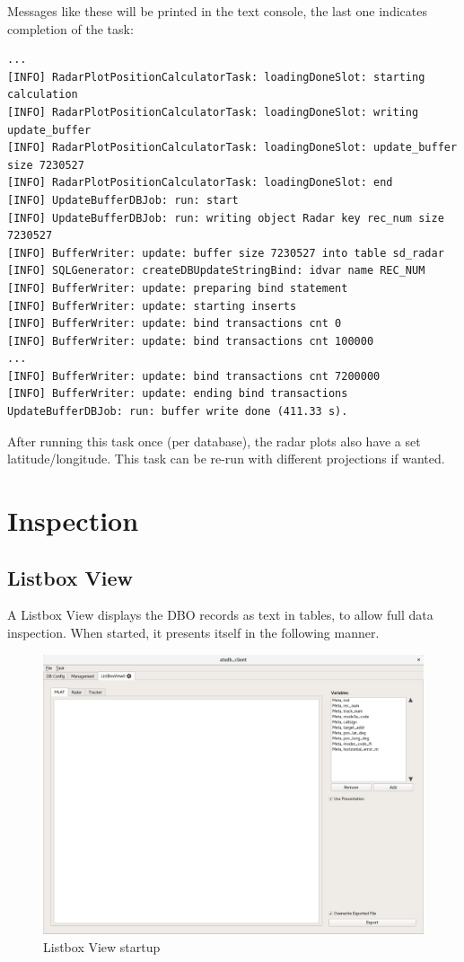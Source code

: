 \documentclass[10pt,letterpaper,extrafontsizes]{memoir}
\begin{document}
Messages like these will be printed in the text console, the last one indicates completion of the task:

\begin{verbatim}
...
[INFO] RadarPlotPositionCalculatorTask: loadingDoneSlot: starting calculation
[INFO] RadarPlotPositionCalculatorTask: loadingDoneSlot: writing update_buffer
[INFO] RadarPlotPositionCalculatorTask: loadingDoneSlot: update_buffer size 7230527
[INFO] RadarPlotPositionCalculatorTask: loadingDoneSlot: end
[INFO] UpdateBufferDBJob: run: start
[INFO] UpdateBufferDBJob: run: writing object Radar key rec_num size 7230527
[INFO] BufferWriter: update: buffer size 7230527 into table sd_radar
[INFO] SQLGenerator: createDBUpdateStringBind: idvar name REC_NUM
[INFO] BufferWriter: update: preparing bind statement
[INFO] BufferWriter: update: starting inserts
[INFO] BufferWriter: update: bind transactions cnt 0
[INFO] BufferWriter: update: bind transactions cnt 100000
...
[INFO] BufferWriter: update: bind transactions cnt 7200000
[INFO] BufferWriter: update: ending bind transactions
UpdateBufferDBJob: run: buffer write done (411.33 s).
\end{verbatim}

After running this task once (per database), the radar plots also have a set latitude/longitude. This task can be re-run with different projections if wanted.

\section{Inspection}
\label{sec:inspection}

\subsection{Listbox View}
\label{sec:listbox_view}
A Listbox View displays the DBO records as text in tables, to allow full data inspection. When started, it presents itself in the following manner.

\begin{figure}[H]
    \hspace*{-2cm}
    \includegraphics[width=18cm]{../screenshots/listbox_start.png}
  \caption{Listbox View startup}
  \label{fig:listbox_start}
\end{figure}
\end{document}
